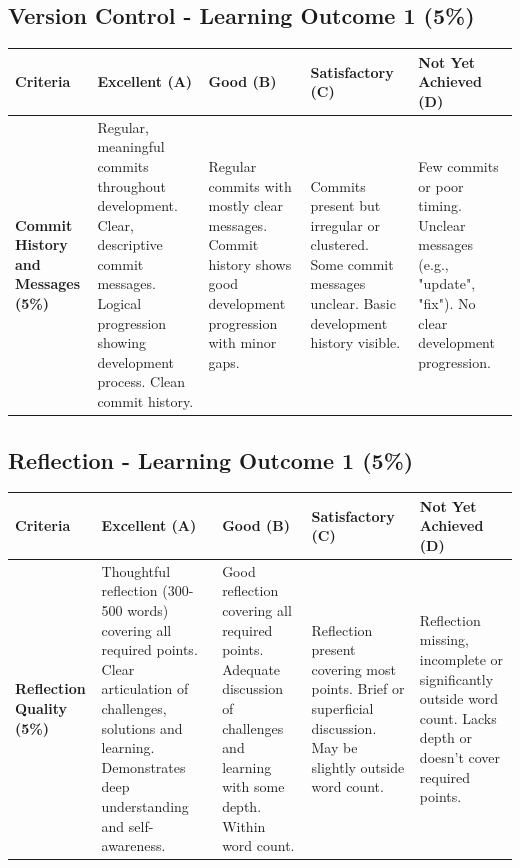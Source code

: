 \documentclass{article}
\begin{document}
\begin{landscape}
\begin{tabular}{|p{5cm}|p{4cm}|p{4cm}|p{4cm}|p{4cm}|}
\end{tabular}

\subsection*{Version Control - Learning Outcome 1 (5\%)}

\begin{tabular}{|p{5cm}|p{4cm}|p{4cm}|p{4cm}|p{4cm}|}
\hline
\textbf{Criteria} & \textbf{Excellent (A)} & \textbf{Good (B)} & \textbf{Satisfactory (C)} & \textbf{Not Yet Achieved (D)} \\ \hline

\textbf{Commit History and Messages (5\%)} & 
Regular, meaningful commits throughout development. Clear, descriptive commit messages. Logical progression showing development process. Clean commit history. & 
Regular commits with mostly clear messages. Commit history shows good development progression with minor gaps. & 
Commits present but irregular or clustered. Some commit messages unclear. Basic development history visible. & 
Few commits or poor timing. Unclear messages (e.g., "update", "fix"). No clear development progression. \\ \hline

\end{tabular}

\subsection*{Reflection - Learning Outcome 1 (5\%)}

\begin{tabular}{|p{5cm}|p{4cm}|p{4cm}|p{4cm}|p{4cm}|}
\hline
\textbf{Criteria} & \textbf{Excellent (A)} & \textbf{Good (B)} & \textbf{Satisfactory (C)} & \textbf{Not Yet Achieved (D)} \\ \hline

\textbf{Reflection Quality (5\%)} & 
Thoughtful reflection (300-500 words) covering all required points. Clear articulation of challenges, solutions and learning. Demonstrates deep understanding and self-awareness. & 
Good reflection covering all required points. Adequate discussion of challenges and learning with some depth. Within word count. & 
Reflection present covering most points. Brief or superficial discussion. May be slightly outside word count. & 
Reflection missing, incomplete or significantly outside word count. Lacks depth or doesn't cover required points. \\ \hline


\end{tabular}
\end{landscape}
\end{document}
